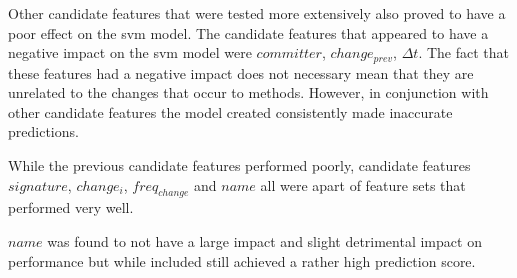 Other candidate features that were tested more extensively also proved to have a poor effect on the \gls{svm} model. The candidate features that appeared to have a negative impact on the \gls{svm} model were $committer$, $change_{prev}$, $\Delta t$. The fact that these features had a negative impact does not necessary mean that they are unrelated to the changes that occur to methods. However, in conjunction with other candidate features the model created consistently made inaccurate predictions.


While the previous candidate features performed poorly, candidate features $signature$, $change_i$, $freq_{change}$ and $name$ all were apart of feature sets that performed very well. 

$name$ was found to not have a large impact and slight detrimental impact on performance but while included still achieved a rather high prediction score. 


